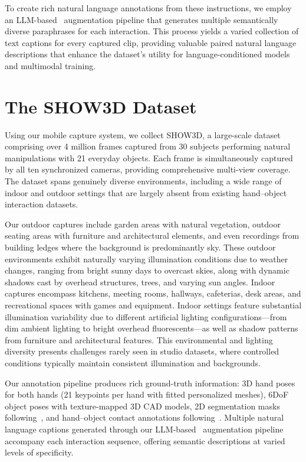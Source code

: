 \documentclass[10pt,twocolumn,letterpaper]{article}
\begin{document}
To create rich natural language annotations from these instructions, we employ an LLM-based~\cite{anthropic_claude_2024} augmentation pipeline that generates multiple semantically diverse paraphrases for each interaction. 
This process yields a varied collection of text captions for every captured clip, providing valuable paired natural language descriptions that enhance the dataset's utility for language-conditioned models and multimodal training.





\section{The SHOW3D Dataset}
Using our mobile capture system, we collect SHOW3D, a large-scale dataset comprising over 4 million frames captured from 30 subjects performing natural manipulations with 21 everyday objects. Each frame is simultaneously captured by all ten synchronized cameras, providing comprehensive multi-view coverage. The dataset spans genuinely diverse environments, including a wide range of indoor and outdoor settings that are largely absent from existing hand–object interaction datasets.

 Our outdoor captures include garden areas with natural vegetation, outdoor seating areas with furniture and architectural elements, and even recordings from building ledges where the background is predominantly sky. These outdoor environments exhibit naturally varying illumination conditions due to weather changes, ranging from bright sunny days to overcast skies, along with dynamic shadows cast by overhead structures, trees, and varying sun angles. Indoor captures encompass kitchens, meeting rooms, hallways, cafeterias, desk areas, and recreational spaces with games and equipment. Indoor settings feature substantial illumination variability due to different artificial lighting configurations—from dim ambient lighting to bright overhead fluorescents—as well as shadow patterns from furniture and architectural features. This environmental and lighting diversity presents challenges rarely seen in studio datasets, where controlled conditions typically maintain consistent illumination and backgrounds.

 Our annotation pipeline produces rich ground-truth information: 3D hand poses for both hands (21 keypoints per hand with fitted personalized meshes), 6DoF object poses with texture-mapped 3D CAD models, 2D segmentation masks following~\cite{ravi2024sam}, and hand–object contact annotations following~\cite{taheri2020grab}. Multiple natural language captions generated through our LLM-based~\cite{anthropic_claude_2024} augmentation pipeline accompany each interaction sequence, offering semantic descriptions at varied levels of specificity. 
\end{document}
